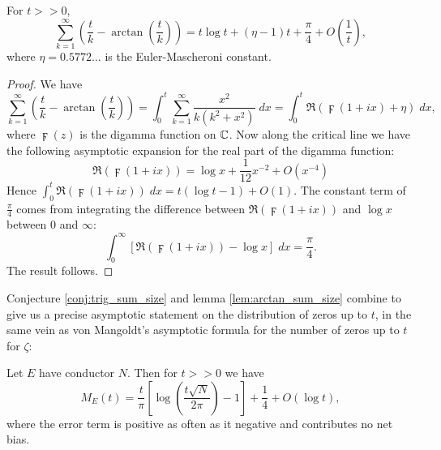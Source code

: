 \documentclass[10pt]{article}
\begin{document}
\begin{lemma}\label{lem:arctan_sum_size}
For $t >> 0$, 
\begin{equation}
\sum_{k=1}^{\infty} \left(\frac{t}{k} - \arctan\left(\frac{t}{k}\right)\right) = t\log t + (\eta-1)t + \frac{\pi}{4} + O\left(\frac{1}{t}\right),
\end{equation}
where $\eta = 0.5772\ldots$ is the Euler-Mascheroni constant.
\end{lemma}
\begin{proof}
We have
\begin{equation*}
\sum_{k=1}^{\infty} \left(\frac{t}{k} - \arctan\left(\frac{t}{k}\right)\right) = \int_{0}^{t} \sum_{k=1}^{\infty} \frac{x^2}{k(k^2+x^2)} \; dx = \int_{0}^{t} \Re\left(\digamma(1+ix) + \eta\right) \; dx,
\end{equation*}
where $\digamma(z)$ is the digamma function on $\mathbb{C}$. Now along the critical line we have the following asymptotic expansion for the real part of the digamma function:
\begin{equation}
\Re\left(\digamma(1+ix)\right) = \log x + \frac{1}{12} x^{-2} + O(x^{-4})
\end{equation}
Hence $\int_{0}^{t} \Re\left(\digamma(1+ix)\right) \; dx = t(\log t - 1)  + O(1)$. The constant term of $\frac{\pi}{4}$ comes from integrating the difference between $\Re\left(\digamma(1+ix)\right)$ and $\log x$ between $0$ and $\infty$:
\begin{equation*}
\int_{0}^{\infty} \left[\Re\left(\digamma(1+ix)\right) - \log x\right] \; dx = \frac{\pi}{4}.
\end{equation*}
The result follows.
\end{proof}

Conjecture \ref{conj:trig_sum_size} and lemma \ref{lem:arctan_sum_size} combine to give us a precise asymptotic statement on the distribution of zeros up to $t$, in the same vein as von Mangoldt's asymptotic formula for the number of zeros up to $t$ for $\zeta$:

\begin{theorem}[S.]
Let $E$ have conductor $N$. Then for $t>>0$ we have
\begin{equation}
M_E(t) = \frac{t}{\pi}\left[\log\left(\frac{t\sqrt{N}}{2\pi}\right) -1 \right] + \frac{1}{4} + O(\log t),
\end{equation}
where the error term is positive as often as it negative and contributes no net bias.
\end{theorem}
\end{document}
